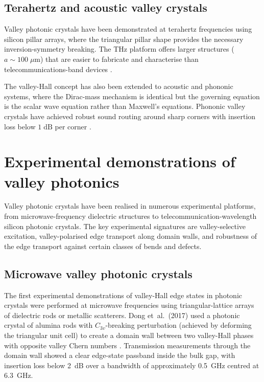 \subsection{Terahertz and acoustic valley crystals}
\label{sec:ch12-thz-acoustic}

Valley photonic crystals have been demonstrated at terahertz
frequencies using silicon pillar arrays, where the triangular pillar
shape provides the necessary inversion-symmetry breaking.  The THz
platform offers larger structures ($a\sim 100\;\mu\mathrm{m}$) that
are easier to fabricate and characterise than telecommunications-band
devices \cite{price2022roadmap,gao2017valley}.

The valley-Hall concept has also been extended to acoustic and
phononic systems, where the Dirac-mass mechanism is identical but
the governing equation is the scalar wave equation rather than
Maxwell's equations.  Phononic valley crystals have achieved robust
sound routing around sharp corners with insertion loss below
$1\;\mathrm{dB}$ per corner \cite{ssstrunk2015observation,
ozawa2018topological}.

\section{Experimental demonstrations of valley photonics}
\label{sec:ch12-valley-experiments}

Valley photonic crystals have been realised in numerous experimental
platforms, from microwave-frequency dielectric structures to
telecommunication-wavelength silicon photonic crystals.  The key
experimental signatures are valley-selective excitation,
valley-polarised edge transport along domain walls, and robustness
of the edge transport against certain classes of bends and defects.

\subsection{Microwave valley photonic crystals}
\label{sec:ch12-microwave-valley}

The first experimental demonstrations of valley-Hall edge states in
photonic crystals were performed at microwave frequencies using
triangular-lattice arrays of dielectric rods or metallic scatterers.
Dong et~al.\ (2017) used a photonic crystal of alumina rods with
$C_{3v}$-breaking perturbation (achieved by deforming the triangular
unit cell) to create a domain wall between two valley-Hall phases with
opposite valley Chern numbers \cite{dong2016valley}.  Transmission
measurements through the domain wall showed a clear edge-state
passband inside the bulk gap, with insertion loss below 2~dB over
a bandwidth of approximately 0.5~GHz centred at 6.3~GHz.

